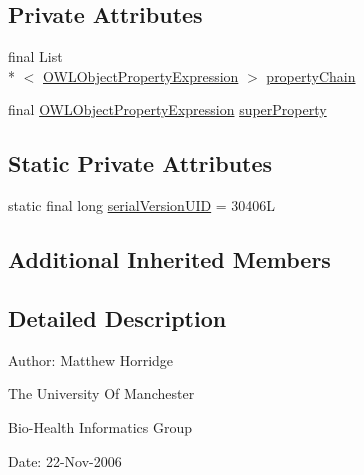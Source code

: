 \subsection*{Private Attributes}
\begin{DoxyCompactItemize}
\item 
final List\\*
$<$ \hyperlink{interfaceorg_1_1semanticweb_1_1owlapi_1_1model_1_1_o_w_l_object_property_expression}{O\-W\-L\-Object\-Property\-Expression} $>$ \hyperlink{classuk_1_1ac_1_1manchester_1_1cs_1_1owl_1_1owlapi_1_1_o_w_l_sub_property_chain_axiom_impl_a2e9cd38ade9b321092820d5e01383020}{property\-Chain}
\item 
final \hyperlink{interfaceorg_1_1semanticweb_1_1owlapi_1_1model_1_1_o_w_l_object_property_expression}{O\-W\-L\-Object\-Property\-Expression} \hyperlink{classuk_1_1ac_1_1manchester_1_1cs_1_1owl_1_1owlapi_1_1_o_w_l_sub_property_chain_axiom_impl_a177b627a8ebbddd97ed06d369bf69bff}{super\-Property}
\end{DoxyCompactItemize}
\subsection*{Static Private Attributes}
\begin{DoxyCompactItemize}
\item 
static final long \hyperlink{classuk_1_1ac_1_1manchester_1_1cs_1_1owl_1_1owlapi_1_1_o_w_l_sub_property_chain_axiom_impl_acbd906340fe0e06760145f696a87fb0e}{serial\-Version\-U\-I\-D} = 30406\-L
\end{DoxyCompactItemize}
\subsection*{Additional Inherited Members}


\subsection{Detailed Description}
Author\-: Matthew Horridge\par
 The University Of Manchester\par
 Bio-\/\-Health Informatics Group\par
 Date\-: 22-\/\-Nov-\/2006\par
\par
 

